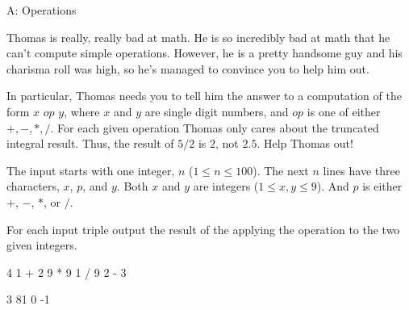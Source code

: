 \begin{problem}{A: Operations}

Thomas is really, really bad at math.
He is so incredibly bad at math that he can't compute simple operations.
However, he is a pretty handsome guy and his charisma roll was high, so he's managed to convince you to help him out.

In particular, Thomas needs you to tell him the answer to a computation of the form $x$ $op$ $y$, where $x$ and $y$ are single digit numbers, and ${op}$ is one of either $+, -, *, /$.
For each given operation Thomas only cares about the truncated integral result.
Thus, the result of $5 / 2$ is $2$, not $2.5$.
Help Thomas out!

\end{problem}

\begin{formalin}
The input starts with one integer, $n$ ($1 \leq n \leq 100$).
The next $n$ lines have three characters, $x$, $p$, and $y$.
Both $x$ and $y$ are integers ($1 \leq x, y \leq 9$).
And $p$ is either $+$, $-$, $*$, or $/$.
\end{formalin}

\begin{formalout}
For each input triple output the result of the applying the operation to the two given integers.
\end{formalout}

\begin{datain}
4
1 + 2
9 * 9
1 / 9
2 - 3
\end{datain}

\begin{dataout}
3
81
0
-1
\end{dataout}

